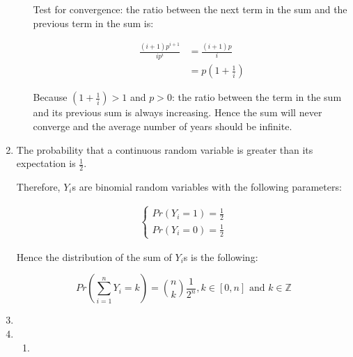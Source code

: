 \documentclass[11pt,letterpaper,titlepage]{article}
\begin{document}
\begin{enumerate}
\begin{enumerate}
        Test for convergence: the ratio between the next term in the sum and the previous term in the sum is:
        
        \begin{equation*}
            \begin{aligned}
                \frac{(i + 1) p^{i + 1}}{i p^i} &= \frac{(i + 1) p}{i} \\
                &= p (1 + \frac{1}{i})
            \end{aligned}
        \end{equation*}
        
        Because $(1 + \frac{1}{i}) > 1$ and $p > 0$: the ratio between the term in the sum and its previous sum is always increasing. Hence the sum will never converge and the average number of years should be infinite.
        
    \end{enumerate}
    
    \item %
    
    The probability that a continuous random variable is greater than its expectation is $\frac{1}{2}$.
    
    Therefore, $Y_i$s are binomial random variables with the following parameters:
    
    \begin{gather*}
        \begin{cases}
        Pr(Y_i = 1) = \frac{1}{2} \\
        Pr(Y_i = 0) = \frac{1}{2}
        \end{cases}
    \end{gather*}

    Hence the distribution of the sum of $Y_i$s is the following:
    
    \begin{equation*}
        Pr(\sum_{i = 1}^{n} Y_i = k) = {n \choose k} \frac{1}{2^n}, k \in [0, n] \text{ and } k \in \mathbb{Z}
    \end{equation*}
    
    
    \item %
    
    \item %
    
    \begin{enumerate}
        \item 
        

\end{enumerate}
\end{enumerate}
\end{document}
